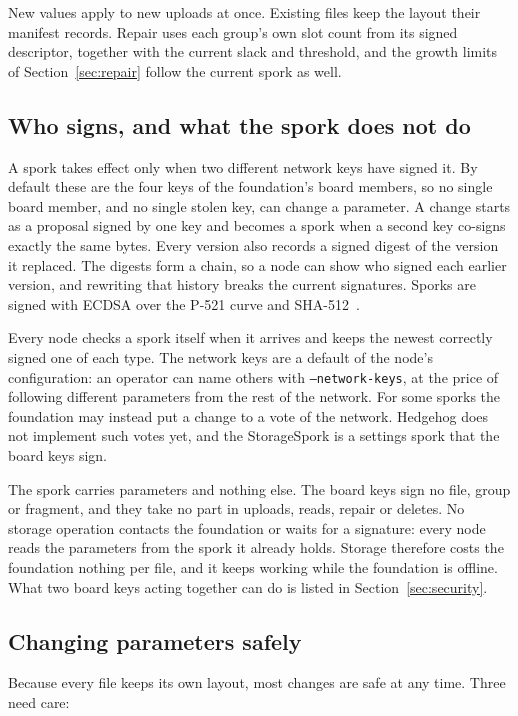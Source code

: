 \documentclass[10pt,a4paper,final]{article}
\newcommand{\code}[1]{\texttt{#1}}
\begin{document}
New values apply to new uploads at once. Existing files keep the layout their manifest records. Repair uses each
group's own slot count from its signed descriptor, together with the current slack and threshold, and the growth
limits of Section~\ref{sec:repair} follow the current spork as well.

\subsection{Who signs, and what the spork does not do}
\label{sec:signers}

A spork takes effect only when two different network keys have signed it. By default these are the four keys of
the foundation's board members, so no single board member, and no single stolen key, can change a parameter. A
change starts as a proposal signed by one key and becomes a spork when a second key co-signs exactly the same bytes.
Every version also records a signed digest of the version it replaced. The digests form a chain, so a node can show
who signed each earlier version, and rewriting that history breaks the current signatures. Sporks are signed with
ECDSA over the P-521 curve and SHA-512~\cite{fips1865}.

Every node checks a spork itself when it arrives and keeps the newest correctly signed one of each type. The network
keys are a default of the node's configuration: an operator can name others with \code{--network-keys}, at the price
of following different parameters from the rest of the network. For some sporks the foundation may instead put a
change to a vote of the network. Hedgehog does not implement such votes yet, and the StorageSpork is a settings spork
that the board keys sign.

The spork carries parameters and nothing else. The board keys sign no file, group or fragment, and they take no part
in uploads, reads, repair or deletes. No storage operation contacts the foundation or waits for a signature: every
node reads the parameters from the spork it already holds. Storage therefore costs the foundation nothing per file,
and it keeps working while the foundation is offline. What two board keys acting together can do is listed in
Section~\ref{sec:security}.

\subsection{Changing parameters safely}

Because every file keeps its own layout, most changes are safe at any time. Three need care:
\end{document}
